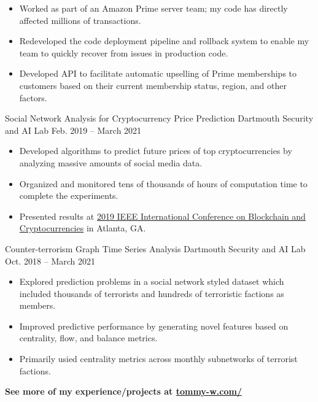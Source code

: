 \documentclass[11pt]{resume}
\begin{document}
    \begin{itemize}
        \setlength{\itemindent}{-0.8em}
        \item Worked as part of an Amazon Prime server team; my code has directly affected millions of
            transactions.
        \item Redeveloped the code deployment pipeline and rollback system to enable my team to 
            quickly recover from issues in production code.
        \item Developed API to facilitate automatic upselling of Prime memberships to customers 
            based on their current membership status, region, and other factors.
    \end{itemize}

    \medskip

    \datedentry
        {Social Network Analysis for Cryptocurrency Price Prediction}
        {Dartmouth Security and AI Lab}
        {Feb. 2019 -- March 2021}
        {}
    
    \begin{itemize}
        \setlength{\itemindent}{-0.8em}
        \item Developed algorithms to predict future prices of top cryptocurrencies by analyzing massive amounts of
            social media data.
        \item Organized and monitored tens of thousands of hours of computation time to complete 
            the experiments.
        \item Presented results at \href{https://www.computer.org/csdl/proceedings/blockchain/2019/1gjS4tubCmI}
            {2019 IEEE International Conference on Blockchain and Cryptocurrencies} in Atlanta, GA.
    \end{itemize}

    \divider

    \datedentry
        {Counter-terrorism Graph Time Series Analysis}
        {Dartmouth Security and AI Lab}
        {Oct. 2018 -- March 2021}
        {}

    \begin{itemize}
        \setlength{\itemindent}{-0.8em}
        \item Explored prediction problems in a social network styled dataset which included thousands of terrorists and hundreds of 
            terroristic factions as members.
        \item Improved predictive performance by generating novel features based on centrality, flow, and balance metrics.
            \item Primarily usied centrality metrics across monthly subnetworks of terrorist factions.
    \end{itemize}

    \divider

    \large\bfseries See more of my experience/projects at \href{https://tommy-w.com/}{tommy-w.com/}
\end{document}
